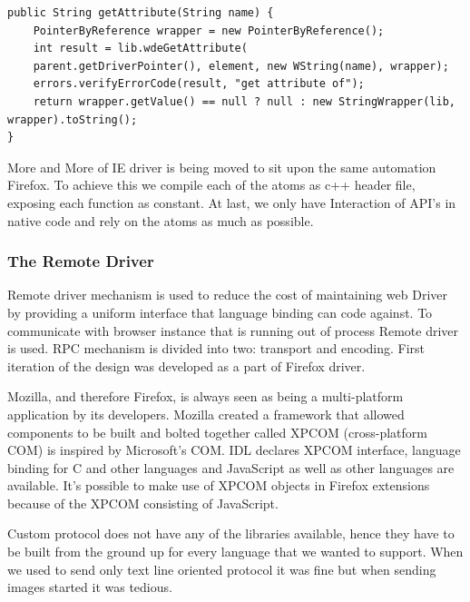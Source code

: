 \documentclass[article,type=msc,colorback,accentcolor=tud9c,twoside,11pt]{tudthesis}
\begin{document}
\begin{lstlisting}
public String getAttribute(String name) {
	PointerByReference wrapper = new PointerByReference();
	int result = lib.wdeGetAttribute(
	parent.getDriverPointer(), element, new WString(name), wrapper);
	errors.verifyErrorCode(result, "get attribute of");
	return wrapper.getValue() == null ? null : new StringWrapper(lib, wrapper).toString();
}
\end{lstlisting}

More and More of IE driver is being moved to sit upon the same automation Firefox. To achieve this we compile each of the atoms as c++ header file, exposing each function as constant. At last, we only have Interaction of API's in native code and rely on the atoms as much as possible.
\subsubsection{The Remote Driver}
Remote driver mechanism is used to reduce the cost of maintaining web Driver by providing a uniform interface that language binding can code against. To communicate with browser instance that is running out of process Remote driver is used. RPC mechanism is divided into two: transport and encoding. First iteration of the design was developed as a part of Firefox driver.

Mozilla, and therefore Firefox, is always seen as being a multi-platform application by its developers. Mozilla created a framework that allowed components to be built and bolted together called XPCOM (cross-platform COM) is inspired by Microsoft's COM.  IDL declares XPCOM interface, language binding for C and other languages and JavaScript as well as other languages are available. It's possible to make use of XPCOM objects in Firefox extensions because of the XPCOM consisting of JavaScript.

Custom protocol does not have any of the libraries available, hence they have to be built from the ground up for every language that we wanted to support. When we used to send only text line oriented protocol it was fine but when sending images started it was tedious.
\end{document}
